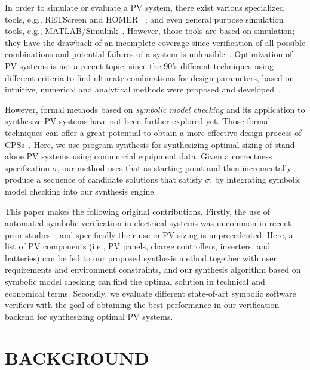 \documentclass[10pt,conference]{IEEEtran}
\begin{document}
In order to simulate or evaluate a PV system, there exist various specialized tools, e.g., RETScreen and HOMER~\cite{Pradhan,Swarnkar}%
; and even general purpose simulation tools, e.g., MATLAB/Simulink~\cite{Gow1999}. %
 However, those tools are based on simulation; they have the drawback of an incomplete coverage  since verification of all possible combinations and potential failures of a system is unfeasible~\cite{ClarkeHV18}. 
 Optimization of PV systems is not a recent topic; since the 90's different techniques using different criteria to find ultimate combinations for design parameters, based on intuitive, numerical and analytical methods were proposed and developed~\cite{Alsadi2018}.
 
However, formal methods based on \textit{symbolic model checking} and its application to synthesize PV systems have not been further explored yet. Those formal techniques can offer a great potential to obtain a more effective design process of CPSs~\cite{ClarkeHV18}. Here, we use program synthesis for synthesizing optimal sizing of stand-alone PV systems using commercial equipment data. Given a correctness specification $\sigma$, our method uses that as starting point and then incrementally produce a sequence of candidate solutions that satisfy $\sigma$, by integrating symbolic model checking into our synthesis engine.

This paper makes the following original contributions. Firstly, the use of automated symbolic verification in electrical systems was uncommon in recent prior studies~\cite{abs-1811-09438}, and specifically their use in PV sizing is unprecedented. Here, a list of PV components (i.e., PV panels, charge controllers, inverters, and batteries) can be fed to our proposed synthesis method together with user requirements and environment constraints, and our synthesis algorithm based on symbolic model checking can find the optimal solution in technical and economical terms. Secondly, we evaluate different state-of-art symbolic software verifiers with the goal of obtaining the best performance in our verification backend for synthesizing optimal PV systems.
%
\section{BACKGROUND}
\label{sec:AutomatedVerification}
%
\end{document}
